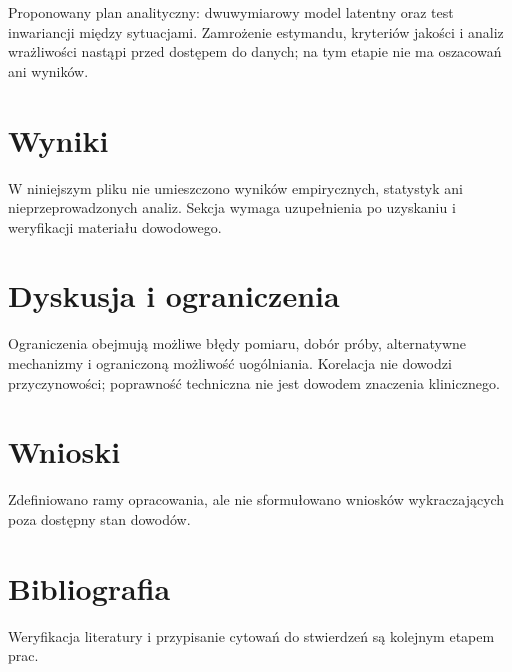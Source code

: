 \documentclass[11pt,a4paper]{article}
\begin{document}
Proponowany plan analityczny: dwuwymiarowy model latentny oraz test inwariancji między sytuacjami. Zamrożenie estymandu, kryteriów jakości i analiz wrażliwości nastąpi przed dostępem do danych; na tym etapie nie ma oszacowań ani wyników.

\section{Wyniki}

W niniejszym pliku nie umieszczono wyników empirycznych, statystyk ani nieprzeprowadzonych analiz. Sekcja wymaga uzupełnienia po uzyskaniu i weryfikacji materiału dowodowego.

\section{Dyskusja i ograniczenia}

Ograniczenia obejmują możliwe błędy pomiaru, dobór próby, alternatywne mechanizmy i ograniczoną możliwość uogólniania. Korelacja nie dowodzi przyczynowości; poprawność techniczna nie jest dowodem znaczenia klinicznego.

\section{Wnioski}

Zdefiniowano ramy opracowania, ale nie sformułowano wniosków wykraczających poza dostępny stan dowodów.

\section*{Bibliografia}

Weryfikacja literatury i przypisanie cytowań do stwierdzeń są kolejnym etapem prac.
\end{document}
